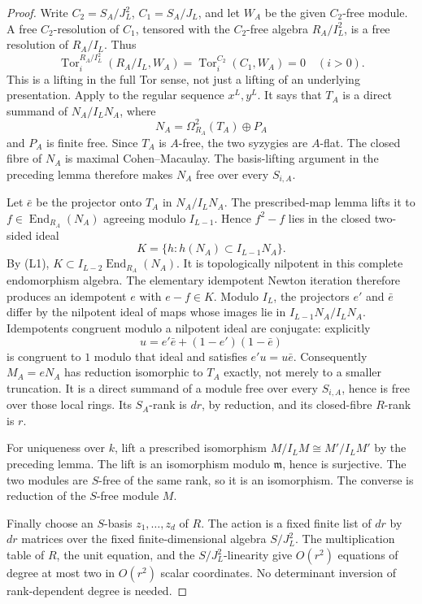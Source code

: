 \begin{proof}
Write \(C_2=S_A/J_L^2\), \(C_1=S_A/J_L\), and let \(W_A\) be the given
\(C_2\)-free module. A free \(C_2\)-resolution of \(C_1\), tensored
with the \(C_2\)-free algebra \(R_A/I_L^2\), is a free resolution
of \(R_A/I_L\). Thus
\[
 \operatorname{Tor}^{R_A/I_L^2}_i(R_A/I_L,W_A)
   =\operatorname{Tor}^{C_2}_i(C_1,W_A)=0\quad(i>0).
\]
This is a lifting in the full Tor sense, not just a lifting of an
underlying presentation.
Apply \cite[Proposition 3.6, pp.~18--19, including its proof]
{AuslanderDingSolberg1993B} to the regular sequence \(x^L,y^L\).
It says that \(T_A\) is a direct summand of \(N_A/I_LN_A\), where
\[
 N_A=\Omega^2_{R_A}(T_A)\oplus P_A
\]
and \(P_A\) is finite free. Since \(T_A\) is \(A\)-free, the two
syzygies are \(A\)-flat. The closed fibre of \(N_A\) is maximal
Cohen--Macaulay. The basis-lifting argument in the preceding lemma
therefore makes \(N_A\) free over every \(S_{i,A}\).

Let \(\bar e\) be the projector onto \(T_A\) in \(N_A/I_LN_A\).
The prescribed-map lemma lifts it to \(f\in\operatorname{End}_{R_A}(N_A)\)
agreeing modulo \(I_{L-1}\).
Hence \(f^2-f\) lies in the closed two-sided ideal
\[
 K=\{h:h(N_A)\subset I_{L-1}N_A\}.
\]
By (L1), \(K\subset I_{L-2}\operatorname{End}_{R_A}(N_A)\).
It is topologically nilpotent in this complete endomorphism algebra.
The elementary idempotent Newton iteration therefore produces an
idempotent \(e\) with \(e-f\in K\).
Modulo \(I_L\), the projectors \(e'\) and \(\bar e\) differ by the
nilpotent ideal of maps whose images lie in
\(I_{L-1}N_A/I_LN_A\). Idempotents congruent modulo a nilpotent ideal
are conjugate: explicitly
\[
 u=e'\bar e+(1-e')(1-\bar e)
\]
is congruent to \(1\) modulo that ideal and satisfies
\(e'u=u\bar e\). Consequently
\(M_A=eN_A\) has reduction isomorphic to \(T_A\) exactly, not merely
to a smaller truncation. It is a direct summand of a module free over
every \(S_{i,A}\), hence is free over those local rings. Its
\(S_A\)-rank is \(dr\), by reduction, and its closed-fibre \(R\)-rank
is \(r\).

For uniqueness over \(k\), lift a prescribed isomorphism
\(M/I_LM\cong M'/I_LM'\) by the preceding lemma.
The lift is an isomorphism modulo \(\mathfrak m\), hence is surjective.
The two modules are \(S\)-free of the same rank, so it is an isomorphism.
The converse is reduction of the \(S\)-free module \(M\).

Finally choose an \(S\)-basis \(z_1,\ldots,z_d\) of \(R\).
The action is a fixed finite list of \(dr\) by \(dr\) matrices over
the fixed finite-dimensional algebra \(S/J_L^2\).
The multiplication table of \(R\), the unit equation, and the
\(S/J_L^2\)-linearity give \(O(r^2)\) equations of degree at most two
in \(O(r^2)\) scalar coordinates. No determinant inversion of
rank-dependent degree is needed.
\end{proof}


